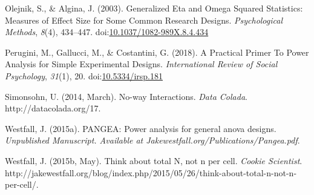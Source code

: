 \documentclass[
  ,jou,floatsintext]{apa6}
\begin{document}
\leavevmode\hypertarget{ref-olejnik_generalized_2003}{}%
Olejnik, S., \& Algina, J. (2003). Generalized Eta and Omega Squared Statistics: Measures of Effect Size for Some Common Research Designs. \emph{Psychological Methods}, \emph{8}(4), 434--447. doi:\href{https://doi.org/10.1037/1082-989X.8.4.434}{10.1037/1082-989X.8.4.434}

\leavevmode\hypertarget{ref-perugini_practical_2018}{}%
Perugini, M., Gallucci, M., \& Costantini, G. (2018). A Practical Primer To Power Analysis for Simple Experimental Designs. \emph{International Review of Social Psychology}, \emph{31}(1), 20. doi:\href{https://doi.org/10.5334/irsp.181}{10.5334/irsp.181}

\leavevmode\hypertarget{ref-simonsohn_no-way_2014}{}%
Simonsohn, U. (2014, March). No-way Interactions. \emph{Data Colada}. http://datacolada.org/17.

\leavevmode\hypertarget{ref-westfall2015pangea}{}%
Westfall, J. (2015a). PANGEA: Power analysis for general anova designs. \emph{Unpublished Manuscript. Available at Jakewestfall.org/Publications/Pangea.pdf}.

\leavevmode\hypertarget{ref-westfall_think_2015}{}%
Westfall, J. (2015b, May). Think about total N, not n per cell. \emph{Cookie Scientist}. http://jakewestfall.org/blog/index.php/2015/05/26/think-about-total-n-not-n-per-cell/.
\end{document}

